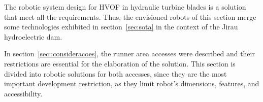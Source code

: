 The robotic system design for HVOF in hydraulic turbine blades is a solution
that meet all the requirements. Thus, the envisioned robots of this section
merge some technologies exhibited in section~\ref{sec:sota} in the context of
the Jirau hydroelectric dam.


In section~\ref{sec::consideracoes}, the runner area accesses were described
and their restrictions are essential for the elaboration of the solution.
This section is divided into robotic solutions for both accesses, since they
are the most important development restriction, as they limit robot's
dimensions, features, and accessibility.

